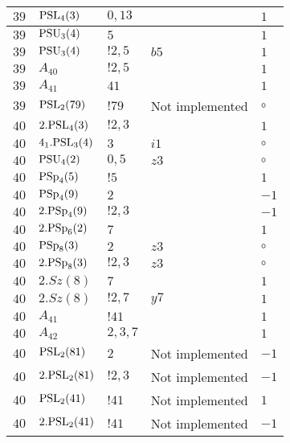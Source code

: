 \documentclass[a4paper, 11pt]{article}
\begin{document}
\begin{longtable}{lllll}
        $ 39 $ & $ {\rm PSL}_{4}(3) $ & $ 0,13 $ & $ ~ $ & $ 1$ \\ \hline
        $ 39 $ & $ {\rm PSU}_{3}(4) $ & $ 5 $ & $ ~ $ & $ 1$ \\ \hline
        $ 39 $ & $ {\rm PSU}_{3}(4) $ & $ ! 2,5 $ & $ b5 $ & $ 1$ \\ \hline
        $ 39 $ & $ A_{40} $ & $ !2, 5 $ & $ ~ $ & $ 1$ \\ \hline
        $ 39 $ & $ A_{41} $ & $ 41 $ & $ ~ $ & $ 1$ \\ \hline
        $ 39 $ & $ {\rm PSL}_{2}(79) $ & $ !79 $ &  Not implemented &  $\circ$ \\ \hline
        $ 40 $ & $ 2.{\rm PSL}_{4}(3) $ & $ ! 2,3 $ & $ ~ $ & $ 1$ \\ \hline
        $ 40 $ & $ 4_1.{\rm PSL}_{3}(4) $ & $ 3 $ & $ i1 $ &  $\circ$ \\ \hline
        $ 40 $ & $ {\rm PSU}_{4}(2) $ & $ 0,5 $ & $ z3 $ &  $\circ$ \\ \hline
        $ 40 $ & $ {\rm PSp}_{4}(5) $ & $ ! 5 $ & $ ~ $ & $ 1$ \\ \hline
        $ 40 $ & $ {\rm PSp}_{4}(9) $ & $ 2 $ & $ ~ $ & $ -1$ \\ \hline
        $ 40 $ & $ 2.{\rm PSp}_{4}(9) $ & $ ! 2,3 $ & $ ~ $ & $ -1$ \\ \hline
        $ 40 $ & $ 2.{\rm PSp}_{6}(2) $ & $ 7 $ & $ ~ $ & $ 1$ \\ \hline
        $ 40 $ & $ {\rm PSp}_{8}(3) $ & $ 2 $ & $ z3 $ &  $\circ$ \\ \hline
        $ 40 $ & $ 2.{\rm PSp}_{8}(3) $ & $ ! 2,3 $ & $ z3 $ &  $\circ$ \\ \hline
        $ 40 $ & $ 2.Sz(8) $ & $ 7 $ & $ ~ $ & $ 1$ \\ \hline
        $ 40 $ & $ 2.Sz(8) $ & $ ! 2,7 $ & $ y7 $ & $ 1$ \\ \hline
        $ 40 $ & $ A_{41} $ & $ !41 $ & $ ~ $ & $ 1$ \\ \hline
        $ 40 $ & $ A_{42} $ & $ 2, 3, 7 $ & $ ~ $ & $ 1$ \\ \hline
        $ 40 $ & $ {\rm PSL}_{2}(81) $ & $ 2 $ &  Not implemented & $ -1$ \\ \hline
        $ 40 $ & $ 2.{\rm PSL}_{2}(81) $ & $ !2, 3 $ &  Not implemented & $ -1$ \\ \hline
        $ 40 $ & $ {\rm PSL}_{2}(41) $ & $ !41 $ &  Not implemented & $ 1$ \\ \hline
        $ 40 $ & $ 2.{\rm PSL}_{2}(41) $ & $ !41 $ &  Not implemented & $ -1$ \\ \hline

\end{longtable}
\end{document}
